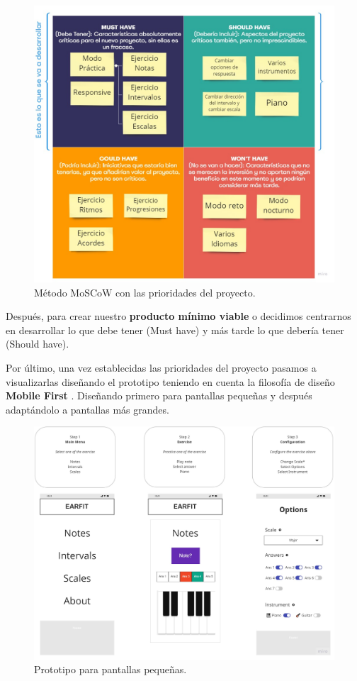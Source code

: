 \documentclass[12pt,twoside,titlepage]{report}
\begin{document}
\begin{figure}[H]
    \centering
    \includegraphics[scale=0.35]{Design Thinking/MosCow}
    \caption{Método MoSCoW con las prioridades del proyecto.}
    \label{fig:MoSCoW}
\end{figure}

Después, para crear nuestro \textbf{producto mínimo viable} o decidimos centrarnos en desarrollar lo que debe tener (Must have) y más tarde lo que debería tener (Should have).

Por último, una vez establecidas las prioridades del proyecto pasamos a visualizarlas diseñando el prototipo teniendo en cuenta la filosofía de diseño \textbf{Mobile First} \cite{mobilefirst}. Diseñando primero para pantallas pequeñas y después adaptándolo a pantallas más grandes. 

\begin{figure}[H]
    \centering
    \includegraphics[width=\textwidth]{Design Thinking/Prototipo/Small/Prototipo}
    \caption{Prototipo para pantallas pequeñas.}
    \label{fig:PrototipoSmall}
\end{figure}
\end{document}
